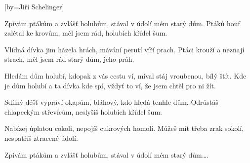 [by={Jiří Schelinger}]

\beginverse{}
Zpívám ptákům a zvlášť holubům,
stával v údolí mém starý dům.
Ptáků houf zalétal ke krovům,
měl jsem rád, holubích křídel šum.
\endverse{}

\beginverse{}
Vlídná dívka jim házela hrách,
mávání perutí víří prach.
Ptáci krouží a neznají strach,
měl jsem rád starý dům, jeho práh.
\endverse{}

\beginchorus{}
Hledám dům holubí, kdopak z vás cestu ví,
míval stáj vroubenou, bílý štít.
Kde je dům holubí a ta dívka kde spí,
vždyť to ví, že jsem chtěl pro ni žít.
\endchorus{}

\beginverse{}
Sdílný déšť vypráví okapům,
bláhový, kdo hledá tenhle dům.
Odrůstáš chlapeckým střevícům,
neslyšíš holubích křídel šum.
\endverse{}

\beginverse{}
Nabízej úplatou cokoli,
nepojíš cukrových homolí.
Můžeš mít třeba zrak sokolí,
nespatříš ztracené údolí.
\endverse{}

\beginchorus{}

\endchorus{}

\beginverse*{}
Zpívám ptákům a zvlášť holubům,
stával v údolí mém starý dům\ldots{}.
\endverse{}

\endsong{}

